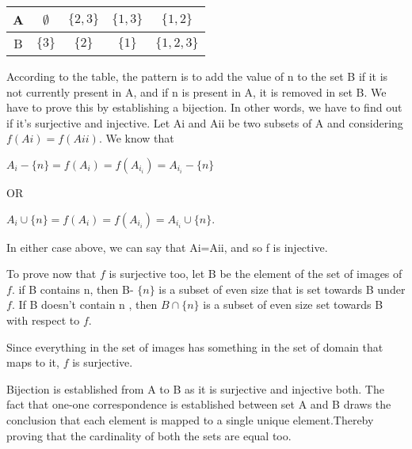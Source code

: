 \documentclass[addpoints]{exam}
\begin{document}
\begin{questions}
\begin{center}

  \begin{tabular}{ |c || c | c | c |c |}
    \hline
 A & $\emptyset$ & $\{2,3\}$ & $\{1,3\}$ & $\{1,2\}$ \\ \hline
 B & $\{3\}$ & $\{2\}$ & $\{1\}$ & $\{1,2,3\}$\\\hline
\end{tabular}
\end{center}

  \begin{solution}
    According to the table, the pattern is to add the value of n to the set B if it is not currently present in A, and if n is present in A, it is removed in set B.
    We have to prove this by establishing a bijection. In other words, we have to find out if it's surjective and injective. Let Ai and Aii be two subsets of A and considering $f(Ai)=f(Aii)$. We know that
    \begin{center}
        $A_i - \{n\} = f(A_i) = f(A_i_i) = A_i_i - \{n\}$
        
        
        OR
        
        
        $A_i \cup \{n\} = f(A_i) = f(A_i_i) = A_i_i \cup \{n\}.$
        
        
        In either case above, we can say that Ai=Aii, and so f is injective.
        
        To prove now that $f$ is surjective too, let B be the element of the set of images of $f$. if  B contains n, then B- $\{n\}$ is a subset of even size that is set towards B under $f$.  If B doesn't contain n , then $B \cap \{n\}$ is a subset of even size set towards B with respect to $f$.
        
        
        Since everything in the set of images has something in the set of domain that maps to it, $f$ is surjective.
        
        Bijection is established from A to B as it is surjective and injective both.
        The fact that one-one correspondence is established between set A and B draws the conclusion that each element is mapped to a single unique element.Thereby proving that the cardinality of both the sets are equal too.
        
        


        
        
        
    \end{center}{}
  \end{solution}
  

\end{questions}
\end{document}
